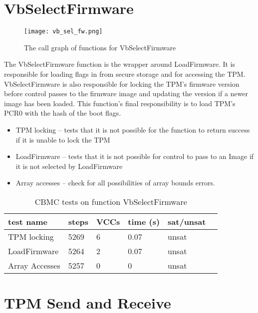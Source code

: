 \section{VbSelectFirmware}

\begin{figure}[!htbp]
  \centering
  \texttt{[image: vb\_sel\_fw.png]}
  \caption[VbSelectFirmware Call Graph]{The call graph of functions for VbSelectFirmware}\label{fig:vbselfw}
\end{figure}

The VbSelectFirmware function is the wrapper around LoadFirmware.
It is responsible for loading flags in from secure storage and for accessing the TPM\@.
VbSelectFirmware is also responsible for locking the TPM's firmware version before control passes to the firmware image and updating the version if a newer image has been loaded.
This function's final responsibility is to load TPM's PCR0 with the hash of the boot flags.

\begin{itemize}
 \item  TPM locking -- tests that it is not possible for the function to return success if it is unable to lock the TPM
 \item  LoadFirmware -- tests that it is not possible for control to pass to an Image if it is not selected by LoadFirmware
 \item  Array accesses -- check for all possibilities of array bounds errors.
\end{itemize}

\begin{table}[!htbp]
    \centering
    \caption{CBMC tests on function VbSelectFirmware}\label{sfw_results}
    \begin{tabular}{llllll}
        \toprule
        test name & steps & VCCs & time (s) & sat/unsat  \\ \bottomrule
        TPM locking & 5269 & 6 & 0.07 & unsat \\
        LoadFirmware & 5264 & 2 &  0.07 & unsat \\
        Array Accesses & 5257 & 0 & 0 &  unsat \\\bottomrule
    \end{tabular}
\end{table}

\section{TPM Send and Receive}

